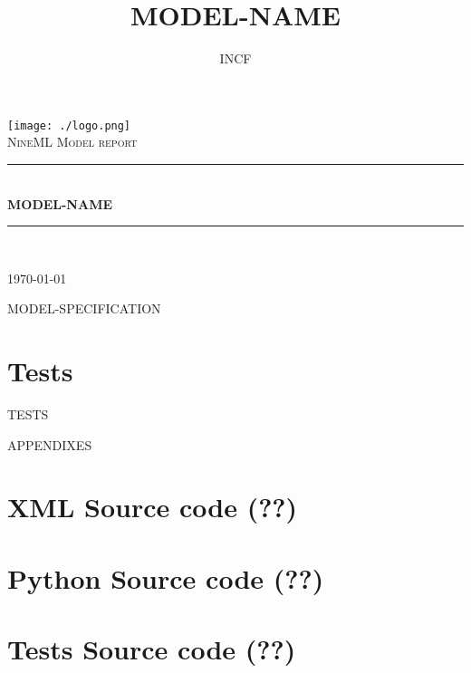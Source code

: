 \documentclass[a4paper]{article}
\title{MODEL-NAME}
\author{INCF}
\newcommand{\HRule}{\rule{\linewidth}{0.2mm}}
\begin{document}
\begin{titlepage}
\begin{center}

\vspace*{5cm}

\texttt{[image: ./logo.png]} \\[1cm]    

\textsc{\Large NineML Model report}\\[0.5cm]

\HRule \\[0.4cm]
{ \huge \bfseries MODEL-NAME}\\[0.4cm]

\HRule \\[1.5cm]

\vfill

{\large \today}

\end{center}
\end{titlepage}
\newpage

\tableofcontents
\newpage

MODEL-SPECIFICATION
\newpage

\section{Tests}

TESTS
\newpage

\appendix

APPENDIXES

\section{XML Source code (??)}

\section{Python Source code (??)}

\section{Tests Source code (??)}

\vfill
\end{document}
